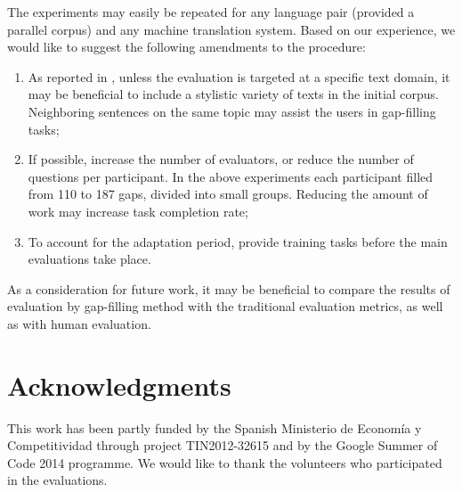 \documentclass[11pt]{article}
\newcommand{\comment}[1]{}
\begin{document}
The experiments may easily be repeated for any language pair (provided a parallel corpus) and
any machine translation system. Based on our experience, we would like to suggest the following amendments to the procedure:
\begin{enumerate}
\item As reported in \cite{oregan13}, unless the evaluation is targeted at a specific text domain, it may be beneficial to include a stylistic variety of texts in the initial corpus. Neighboring sentences on the same topic may assist the users in gap-filling tasks;
\item If possible, increase the number of evaluators, or reduce the number of questions per participant. In the above experiments each participant filled from 110 to 187 gaps, divided into small groups. Reducing the amount of work may increase task completion rate;\comment{MLF's crazy idea: recaptchas?}\comment{EA: the participants did not leave the gaps empty, they just did not attempt the next portions of evaluation after finishing some and getting bored. or did I misunderstand the use of captchas? }
\item To account for the adaptation period, provide training tasks before the main evaluations take place.
\end{enumerate}

As a consideration for future work, it may be beneficial to compare the results of evaluation by gap-filling method with the traditional evaluation metrics, as well as with human evaluation.

\section*{Acknowledgments}

This work has been partly funded by the Spanish Ministerio de Econom{\'i}a y Competitividad through project TIN2012-32615 and by the Google Summer of Code 2014 programme. We would like to thank the volunteers who participated in the evaluations.



\comment{EA: urls do not show up in web citations, how can I fix that?}

\end{document}
